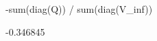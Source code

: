 \begin{Schunk}
\begin{Sinput}
 -sum(diag(Q)) / sum(diag(V_inf))
\end{Sinput}
\begin{Soutput}
[1] -0.346845
\end{Soutput}
\end{Schunk}
